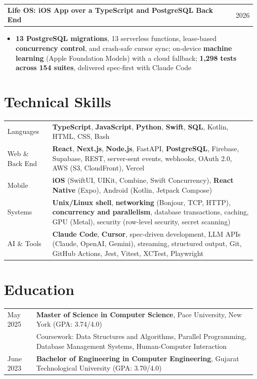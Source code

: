 \documentclass[a4paper,9.5pt]{article}
\makeatletter
\newenvironment{joblong}[2]
    {
    \begin{tabularx}{\linewidth}{@{}l X r@{}}
    \textbf{#1} & \hfill & #2 \\[0pt]
    \end{tabularx}
    \begin{minipage}[t]{\linewidth}
    \begin{itemize}[nosep,after=\strut, leftmargin=1em, itemsep=1pt,label=\textbullet]
    }
    {
    \end{itemize}
    \end{minipage}
    }
\makeatother
\begin{document}
\begin{joblong}{Life OS: iOS App over a TypeScript and PostgreSQL Back End \normalfont{(Swift, TypeScript, SQL)}}{2026}
\item \textbf{13 PostgreSQL migrations}, 13 serverless functions, lease-based \textbf{concurrency control}, and crash-safe cursor sync; on-device \textbf{machine learning} (Apple Foundation Models) with a cloud fallback; \textbf{1,298 tests across 154 suites}, delivered spec-first with Claude Code
\end{joblong}

\section{Technical Skills}
\begin{tabularx}{\linewidth}{@{}l X@{}}
Languages & \normalsize{\textbf{TypeScript}, \textbf{JavaScript}, \textbf{Python}, \textbf{Swift}, \textbf{SQL}, Kotlin, HTML, CSS, Bash} \\
Web \& Back End & \normalsize{\textbf{React}, \textbf{Next.js}, \textbf{Node.js}, FastAPI, \textbf{PostgreSQL}, Firebase, Supabase, REST, server-sent events, webhooks, OAuth 2.0, AWS (S3, CloudFront), Vercel} \\
Mobile & \normalsize{\textbf{iOS} (SwiftUI, UIKit, Combine, Swift Concurrency), \textbf{React Native} (Expo), Android (Kotlin, Jetpack Compose)} \\
Systems & \normalsize{\textbf{Unix/Linux shell}, \textbf{networking} (Bonjour, TCP, HTTP), \textbf{concurrency and parallelism}, database transactions, caching, GPU (Metal), security (row-level security, secret scanning)} \\
AI \& Tools & \normalsize{\textbf{Claude Code}, \textbf{Cursor}, spec-driven development, LLM APIs (Claude, OpenAI, Gemini), streaming, structured output, Git, GitHub Actions, Jest, Vitest, XCTest, Playwright} \\
\end{tabularx}

\section{Education}
\begin{tabularx}{\linewidth}{@{}l X@{}}
May 2025 & \textbf{Master of Science in Computer Science}, Pace University, New York \hfill (GPA: 3.74/4.0) \\
 & \small{Coursework: Data Structures and Algorithms, Parallel Programming, Database Management Systems, Human-Computer Interaction} \\
June 2023 & \textbf{Bachelor of Engineering in Computer Engineering}, Gujarat Technological University \hfill (GPA: 3.70/4.0) \\
\end{tabularx}
\end{document}
